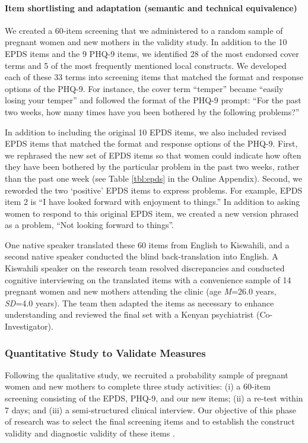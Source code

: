 \documentclass[man,natbib,longtable]{apa6}\usepackage[]{graphicx}\usepackage[]{color}
\begin{document}
\paragraph{Item shortlisting and adaptation (semantic and technical equivalence)}

We created a 60-item screening that we administered to a random sample of pregnant women and new mothers in the validity study. In addition to the 10 EPDS items and the 9 PHQ-9 items, we identified 28 of the most endorsed cover terms and 5 of the most frequently mentioned local constructs. We developed each of these 33 terms into screening items that matched the format and response options of the PHQ-9. For instance, the cover term ``temper'' became ``easily losing your temper'' and followed the format of the PHQ-9 prompt: ``For the past two weeks, how many times have you been bothered by the following problems?'' 

In addition to including the original 10 EPDS items, we also included revised EPDS items that matched the format and response options of the PHQ-9. First, we rephrased the new set of EPDS items so that women could indicate how often they have been bothered by the particular problem in the past two weeks, rather than the past one week (see Table \ref{tbl:epds} in the Online Appendix). Second, we reworded the two `positive' EPDS items to express problems. For example, EPDS item 2 is ``I have looked forward with enjoyment to things.'' In addition to asking women to respond to this original EPDS item, we created a new version phrased as a problem, ``Not looking forward to things''. 

One native speaker translated these 60 items from English to Kiswahili, and a second native speaker conducted the blind back-translation into English. A Kiswahili speaker on the research team resolved discrepancies and conducted cognitive interviewing on the translated items with a convenience sample of 14 pregnant women and new mothers attending the clinic (age \textit{M}=26.0 years, \textit{SD}=4.0 years). The team then adapted the items as necessary to enhance understanding and reviewed the final set with a Kenyan psychiatrist (Co-Investigator).

\subsubsection{Quantitative Study to Validate Measures}

Following the qualitative study, we recruited a probability sample of pregnant women and new mothers to complete three study activities: (i) a 60-item screening consisting of the EPDS, PHQ-9, and our new items; (ii) a re-test within 7 days; and (iii) a semi-structured clinical interview. Our objective of this phase of research was to select the final screening items and to establish the construct validity and diagnostic validity of these items \citep{Kohrt:2011}.
\end{document}
